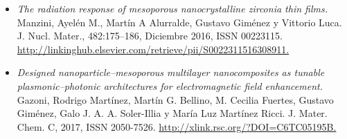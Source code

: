 \begin{itemize}[leftmargin=0cm,label={}]
    \item  \textit{The radiation response of mesoporous nanocrystalline zirconia thin films.} Manzini, Ayelén M., Martín A Alurralde, Gustavo Giménez y Vittorio Luca. J. Nucl. Mater., 482:175–186, Diciembre 2016, ISSN 00223115. \url{http://linkinghub.elsevier.com/retrieve/pii/S0022311516308911.}

    \item \textit{Designed nanoparticle–mesoporous multilayer nanocomposites as tunable
    plasmonic–photonic architectures for electromagnetic field enhancement.}  Gazoni, Rodrigo Martínez, Martín G. Bellino, M. Cecilia Fuertes, Gustavo Giménez, Galo J. A. A. Soler-Illia y María Luz Martínez Ricci. J. Mater. Chem. C, 2017, ISSN 2050-7526. \url{http://xlink.rsc.org/?DOI=C6TC05195B.}
    

  \end{itemize}	

  \let\thispagestyle=\originalstyle